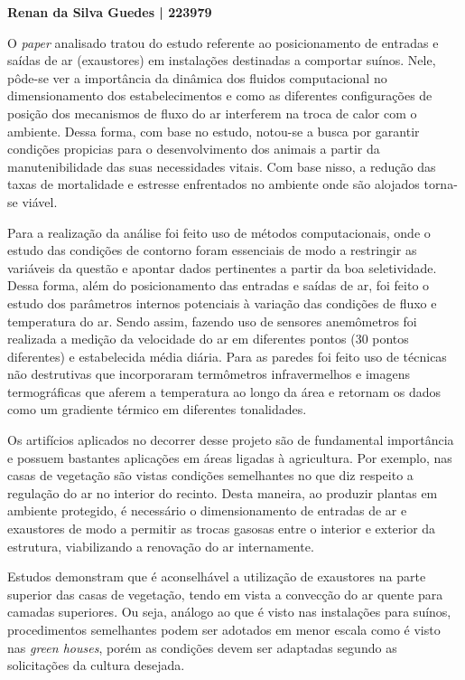 \documentclass[a4paper, 12pt]{article}
\begin{document}
	\noindent\textbf{Renan da Silva Guedes | 223979}
	
	\vspace{.5cm}
	O \textit{paper} analisado tratou do estudo referente ao posicionamento de entradas e saídas de ar (exaustores) em instalações destinadas a comportar suínos. Nele, pôde-se ver a importância da dinâmica dos fluidos computacional no dimensionamento dos estabelecimentos e como as diferentes configurações de posição dos mecanismos de fluxo do ar interferem na troca de calor com o ambiente. Dessa forma, com base no estudo, notou-se a busca por garantir condições propicias para o desenvolvimento dos animais a partir da manutenibilidade das suas necessidades vitais. Com base nisso, a redução das taxas de mortalidade e estresse enfrentados no ambiente onde são alojados torna-se viável.  
	
	Para a realização da análise foi feito uso de métodos computacionais, onde o estudo das condições de contorno foram essenciais de modo a restringir as variáveis da questão e apontar dados pertinentes a partir da boa seletividade. Dessa forma, além do posicionamento das entradas e saídas de ar, foi feito o estudo dos parâmetros internos potenciais à variação das condições de fluxo e temperatura do ar. Sendo assim, fazendo uso de sensores anemômetros foi realizada a medição da velocidade do ar em diferentes pontos (30 pontos diferentes) e estabelecida média diária. Para as paredes foi feito uso de técnicas não destrutivas que incorporaram termômetros infravermelhos e imagens termográficas que aferem a temperatura ao longo da área e retornam os dados como um gradiente térmico em diferentes tonalidades.
	
	Os artifícios aplicados no decorrer desse projeto são de fundamental importância e possuem bastantes aplicações em áreas ligadas à agricultura. Por exemplo, nas casas de vegetação são vistas condições semelhantes no que diz respeito a regulação do ar no interior do recinto. Desta maneira, ao produzir plantas em ambiente protegido, é necessário o dimensionamento de entradas de ar e exaustores de modo a permitir as trocas gasosas entre o interior e exterior da estrutura, viabilizando a renovação do ar internamente. 
	
	Estudos demonstram que é aconselhável a utilização de exaustores na parte superior das casas de vegetação, tendo em vista a convecção do ar quente para camadas superiores. Ou seja, análogo ao que é visto nas instalações para suínos, procedimentos semelhantes podem ser adotados em menor escala como é visto nas \textit{green houses}, porém as condições devem ser adaptadas segundo as solicitações da cultura desejada.
	
\end{document}
